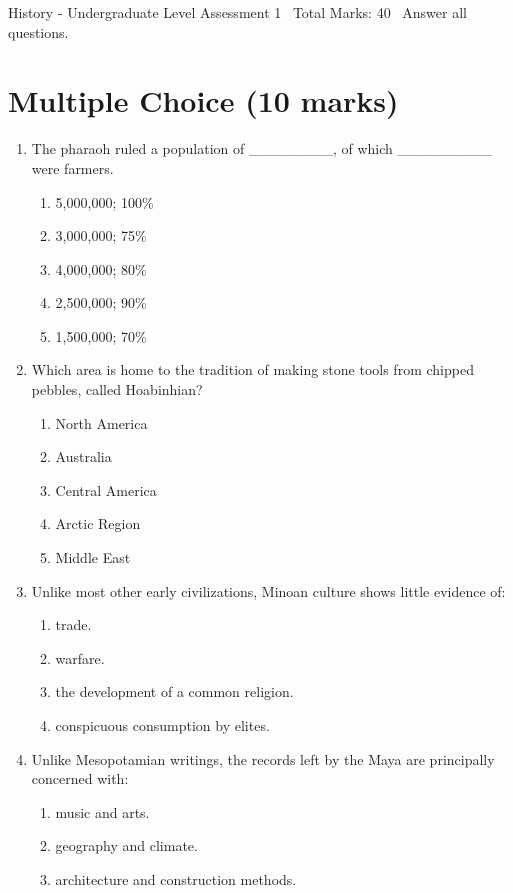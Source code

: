 \documentclass[12pt]{article}
\begin{document}
\begin{center}
History - Undergraduate Level Assessment 1 \
Total Marks: 40 \
Answer all questions.
\end{center}

\section*{Multiple Choice (10 marks)}
\begin{enumerate}[label=\arabic*.]
\item The pharaoh ruled a population of \_\_\_\_\_\_\_\_, of which \_\_\_\_\_\_\_\_\_ were farmers.
\begin{enumerate}[label=(\alph*)]
    \item 5,000,000; 100\%
    \item 3,000,000; 75\%
    \item 4,000,000; 80\%
    \item 2,500,000; 90\%
    \item 1,500,000; 70\%
\end{enumerate}
\item Which area is home to the tradition of making stone tools from chipped pebbles, called Hoabinhian?
\begin{enumerate}[label=(\alph*)]
    \item North America
    \item Australia
    \item Central America
    \item Arctic Region
    \item Middle East
\end{enumerate}
\item Unlike most other early civilizations, Minoan culture shows little evidence of:
\begin{enumerate}[label=(\alph*)]
    \item trade.
    \item warfare.
    \item the development of a common religion.
    \item conspicuous consumption by elites.
\end{enumerate}
\item Unlike Mesopotamian writings, the records left by the Maya are principally concerned with:
\begin{enumerate}[label=(\alph*)]
    \item music and arts.
    \item geography and climate.
    \item architecture and construction methods.

\end{enumerate}
\end{enumerate}
\end{document}
